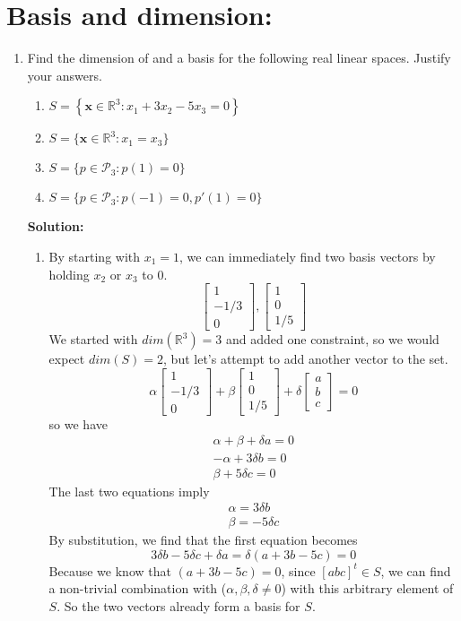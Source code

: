 \documentclass[]{article}
\newcommand{\R}{\mathbb{R}}				%
\newcommand{\bbm}{\begin{bmatrix}}		%
\newcommand{\ebm}{\end{bmatrix}}		%
\newcommand{\x}{\bm{x}}					%
\newcommand{\solution}{\vskip 0.5cm \textbf{\large Solution:} \\}
\begin{document}
    \section*{Basis and dimension:}
    \begin{enumerate}[resume]

	\item Find the dimension of and a basis for the following real linear spaces. Justify your answers.
	  \begin{enumerate}
	  \item $S=\left\{\x\in\R^3 : x_1+3x_2-5x_3=0 \right\}$
	  \item $S=\{\x\in\R^3 : x_1=x_3 \}$
	  \item $S = \{p\in\mathcal{P}_3: p(1)=0\}$
	  \item $S = \{p\in\mathcal{P}_3: p(-1)=0, p'(1)=0\}$
	  \end{enumerate}

	  \solution
	  \begin{enumerate}
	  \item By starting with $x_1 = 1$, we can immediately find two
        basis vectors by holding $x_2$ or $x_3$ to 0.
        \[
        \bbm 1 \\ -1/3 \\ 0 \ebm, \bbm 1 \\ 0 \\ 1/5 \ebm
        \]
        We started with $dim(\R^3) = 3$ and added one constraint, so
        we would expect $dim(S) = 2$, but let's attempt to add another
        vector to the set.
        \[
        \alpha \bbm 1 \\ -1/3 \\ 0 \ebm + \beta \bbm 1 \\ 0 \\ 1/5 \ebm + \delta \bbm a \\ b \\ c \ebm = 0
        \]
        so we have
        \begin{gather*}
          \alpha + \beta + \delta a = 0 \\
          -\alpha + 3 \delta b = 0 \\
          \beta + 5 \delta c = 0
        \end{gather*}
        The last two equations imply
        \begin{gather*}
          \alpha = 3 \delta b \\
          \beta = - 5 \delta c
        \end{gather*}
        By substitution, we find that the first equation becomes
        \[
        3 \delta b - 5\delta c + \delta a = \delta(a + 3b - 5c) = 0
        \]
        Because we know that $(a + 3b - 5c) = 0$, since $[a b c]^t \in
        S$, we can find a non-trivial combination with
        ($\alpha,\beta,\delta \neq 0$) with this arbitrary element of
        $S$. So the two vectors already form a basis for $S$.


\end{enumerate}
\end{enumerate}
\end{document}
